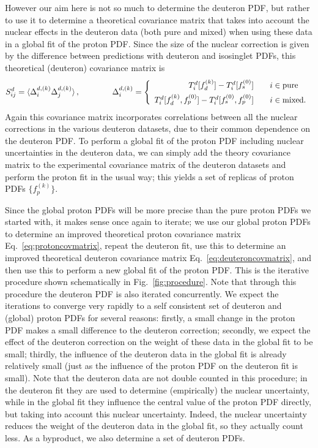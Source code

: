 \documentclass[11pt,a4paper]{article}
\begin{document}
However our aim here is not so much to determine the deuteron PDF, but rather
to use it to determine a theoretical covariance matrix that takes into account
the nuclear effects in the deuteron data (both pure and mixed) when using these
data in a global fit of the proton PDF. Since the size of the nuclear correction
is given by the difference between predictions with deuteron and isosinglet
PDFs, this theoretical (deuteron) covariance matrix is
\begin{equation}
  S_{ij}^d
  =\langle\Delta_i^{d,(k)}\Delta_j^{d,(k)}\rangle\,,
  \qquad\qquad
  \Delta_i^{d,(k)}= \left\{\begin{array}{r@{\qquad}l}
    T_i^d[f_d^{(k)}]-T_i^d[f_s^{(0)}]  & i\in {\rm pure} \\[1ex]
    T_i^d[f_d^{(k)},f_p^{(0)}]-T_i^d[f_s^{(0)},f_p^{(0)}]  &  i\in {\rm mixed.}
   \end{array}\right.\,
  \label{eq:deuteroncovmatrix}
\end{equation}
Again this covariance matrix incorporates correlations between all the nuclear
corrections in the various deuteron datasets, due to their common dependence on
the deuteron PDF. To perform a global fit of the proton PDF including
nuclear uncertainties in the deuteron data, we can simply add the theory
covariance matrix to the experimental covariance matrix of the deuteron
datasets and perform the proton fit in the usual way; this yields a set of
replicas of proton PDFs $\{f_p^{(k)}\}$.

Since the global proton PDFs will be more precise than the pure proton PDFs we
started with, it makes sense once again to iterate; we use our global proton
PDFs to determine an improved theoretical proton covariance matrix
Eq.~\eqref{eq:protoncovmatrix}, repeat the deuteron fit, use this to determine
an improved theoretical deuteron covariance matrix
Eq.~\eqref{eq:deuteroncovmatrix}, and then use this to perform a new global
fit of the proton PDF. This is the iterative procedure shown schematically in
Fig.~\ref{fig:procedure}. Note that through this procedure the deuteron PDF is
also iterated concurrently. We expect the iterations to converge very rapidly
to a self consistent set of deuteron and (global) proton PDFs for several
reasons: firstly, a small change in the proton PDF makes a small difference to
the deuteron correction; secondly, we expect the effect of the deuteron
correction on the weight of these data in the global fit to be small; thirdly,
the influence of the deuteron data in the global fit is already relatively
small (just as the influence of the proton PDF on the deuteron fit is small).
Note that the deuteron data are not double counted in this procedure; in the
deuteron fit they are used to determine (empirically) the nuclear uncertainty,
while in the global fit they influence the central value of the proton PDF
directly, but taking into account this nuclear uncertainty. Indeed, the nuclear
uncertainty reduces the weight of the deuteron data in the global fit, so they
actually count less. As a byproduct, we also determine a set of deuteron PDFs.
\end{document}
